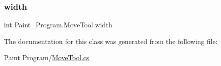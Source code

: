\mbox{\label{class_paint___program_1_1_move_tool_ac052d025ab503efc581c5ce75caa140b}} 
\subsubsection{\texorpdfstring{width}{width}}
{\footnotesize\ttfamily int Paint\+\_\+\+Program.\+Move\+Tool.\+width\hspace{0.3cm}{\ttfamily [private]}}



The documentation for this class was generated from the following file\+:\begin{DoxyCompactItemize}
\item 
Paint Program/\mbox{\hyperlink{_move_tool_8cs}{Move\+Tool.\+cs}}\end{DoxyCompactItemize}
